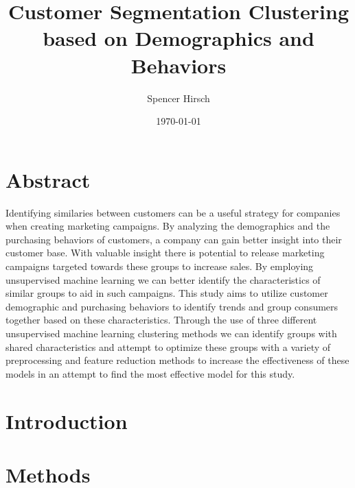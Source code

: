 \documentclass{article}
\title{Customer Segmentation Clustering based on Demographics and Behaviors}
\author{Spencer Hirsch}
\date{\today}
\begin{document}
\maketitle



\begin{multicols}{2}
\section{Abstract}

Identifying similaries between customers can be a useful strategy for companies when creating marketing campaigns. By analyzing the 
demographics and the purchasing behaviors of customers, a company can gain better insight into their customer base.
With valuable insight there is potential to release marketing campaigns targeted towards these groups to increase sales.
By employing unsupervised machine learning we can better identify the characteristics of similar groups to aid in
such campaigns. This study aims to utilize customer demographic and purchasing behaviors to identify trends and group consumers
together based on these characteristics. Through the use of three different unsupervised machine learning clustering methods 
we can identify groups with shared characteristics and attempt to optimize these groups with a variety of preprocessing and 
feature reduction methods to increase the effectiveness of these models in an attempt to find the most effective model for this
study.

\section{Introduction}



\section{Methods}


\end{multicols}
\end{document}
